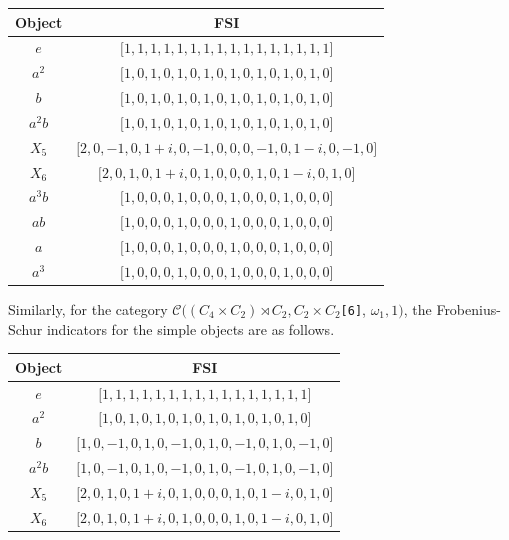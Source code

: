 \documentclass[a4paper, 10pt]{book}
\theoremstyle{definition}
\numberwithin{equation}{chapter}
\newcommand\lstl{\lstinline}
\newcommand\C{\mathcal C}
\newcommand\semidir\rtimes
\begin{document}
\begin{enumerate}
\begin{center}
\begin{tabular}{|c|c|}
\hline
Object & FSI                                                              \\ \hline
$e$    & ${[}1, 1, 1, 1, 1, 1, 1, 1, 1, 1, 1, 1, 1, 1, 1, 1{]}$             \\ \hline
$a^2$  & ${[}1, 0, 1, 0, 1, 0, 1, 0, 1, 0, 1, 0, 1, 0, 1, 0{]}$             \\ \hline
$b$      & ${[}1, 0, 1, 0, 1, 0, 1, 0, 1, 0, 1, 0, 1, 0, 1, 0{]}$             \\ \hline
$a^2b$ & ${[}1, 0, 1, 0, 1, 0, 1, 0, 1, 0, 1, 0, 1, 0, 1, 0{]}$             \\ \hline
$X_5$  & ${[}2, 0, -1, 0, 1 + i, 0, -1, 0, 0, 0, -1, 0, 1 - i, 0, -1, 0{]}$ \\ \hline
$X_6$  & ${[}2, 0, 1, 0, 1 + i, 0, 1, 0, 0, 0, 1, 0, 1 - i, 0, 1, 0{]}    $ \\ \hline
$a^3b$ & ${[}1, 0, 0, 0, 1, 0, 0, 0, 1, 0, 0, 0, 1, 0, 0, 0{]}$             \\ \hline
$ab$   & ${[}1, 0, 0, 0, 1, 0, 0, 0, 1, 0, 0, 0, 1, 0, 0, 0{]}$             \\ \hline
$a$    & ${[}1, 0, 0, 0, 1, 0, 0, 0, 1, 0, 0, 0, 1, 0, 0, 0{]}$             \\ \hline
$a^3$  & ${[}1, 0, 0, 0, 1, 0, 0, 0, 1, 0, 0, 0, 1, 0, 0, 0{]}$             \\ \hline
\end{tabular}
\end{center}
Similarly, for the category $\C((C_4 \times C_2) \semidir C_2, C_2\times C_2$\lstl{[6]}, $\omega_1, 1)$, the Frobenius-Schur indicators for the simple objects are as follows.
\begin{center}
\begin{tabular}{|c|c|}
\hline
Object & FSI                                                          \\ \hline
$e$    & ${[}1, 1, 1, 1, 1, 1, 1, 1, 1, 1, 1, 1, 1, 1, 1, 1{]} $        \\ \hline
$a^2$  & ${[}1, 0, 1, 0, 1, 0, 1, 0, 1, 0, 1, 0, 1, 0, 1, 0{]}$         \\ \hline
$b $     & ${[}1, 0, -1, 0, 1, 0, -1, 0, 1, 0, -1, 0, 1, 0, -1, 0{]}$     \\ \hline
$a^2b$ & ${[}1, 0, -1, 0, 1, 0, -1, 0, 1, 0, -1, 0, 1, 0, -1, 0{]}$     \\ \hline
$X_5$  & ${[}2, 0, 1, 0, 1 + i, 0, 1, 0, 0, 0, 1, 0, 1 - i, 0, 1, 0{]}$ \\ \hline
$X_6$  & ${[}2, 0, 1, 0, 1 + i, 0, 1, 0, 0, 0, 1, 0, 1 - i, 0, 1, 0{]}$ \\ \hline

\end{tabular}
\end{center}
\end{enumerate}
\end{document}
